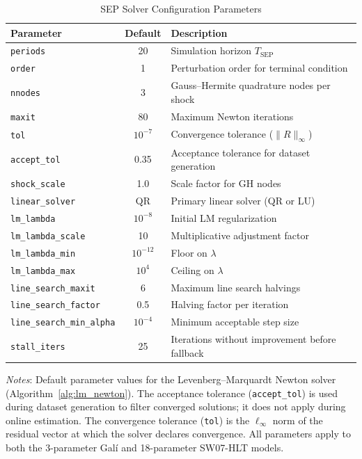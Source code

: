 \documentclass[12pt]{article}
\theoremstyle{plain}
\theoremstyle{definition}
\theoremstyle{remark}
\newcommand{\tablenotes}[1]{%
  \par\vspace{0.5em}%
  \noindent\begin{minipage}{\textwidth}%
  \raggedright\footnotesize #1%
  \end{minipage}\par%
}
\begin{document}
\begin{table}[htbp]
\centering
\caption{SEP Solver Configuration Parameters}
\label{tab:sep_solver_params}
\begin{tabular}{lcp{7.0cm}}
\toprule
Parameter & Default & Description \\
\midrule
\texttt{periods} & 20 & Simulation horizon $T_{\text{SEP}}$ \\
\texttt{order} & 1 & Perturbation order for terminal condition \\
\texttt{nnodes} & 3 & Gauss--Hermite quadrature nodes per shock \\
\texttt{maxit} & 80 & Maximum Newton iterations \\
\texttt{tol} & $10^{-7}$ & Convergence tolerance ($\|R\|_\infty$) \\
\texttt{accept\_tol} & 0.35 & Acceptance tolerance for dataset generation \\
\texttt{shock\_scale} & 1.0 & Scale factor for GH nodes \\
\texttt{linear\_solver} & QR & Primary linear solver (QR or LU) \\
\texttt{lm\_lambda} & $10^{-8}$ & Initial LM regularization \\
\texttt{lm\_lambda\_scale} & 10 & Multiplicative adjustment factor \\
\texttt{lm\_lambda\_min} & $10^{-12}$ & Floor on $\lambda$ \\
\texttt{lm\_lambda\_max} & $10^{4}$ & Ceiling on $\lambda$ \\
\texttt{line\_search\_maxit} & 6 & Maximum line search halvings \\
\texttt{line\_search\_factor} & 0.5 & Halving factor per iteration \\
\texttt{line\_search\_min\_alpha} & $10^{-4}$ & Minimum acceptable step size \\
\texttt{stall\_iters} & 25 & Iterations without improvement before fallback \\
\bottomrule
\end{tabular}
\smallskip
\tablenotes{\textit{Notes}: Default parameter values for the Levenberg--Marquardt Newton solver (Algorithm~\ref{alg:lm_newton}). The acceptance tolerance (\texttt{accept\_tol}) is used during dataset generation to filter converged solutions; it does not apply during online estimation. The convergence tolerance (\texttt{tol}) is the $\ell_\infty$ norm of the residual vector at which the solver declares convergence. All parameters apply to both the 3-parameter Gal\'i and 18-parameter SW07-HLT models.}
\end{table}
\end{document}
